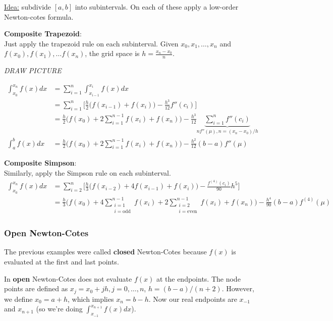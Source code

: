 \documentclass[12pt]{article}
\begin{document}
\underline{Idea:} subdivide $[a,b]$ into subintervals. On each of these apply a low-order Newton-cotes formula.

\textbf{Composite Trapezoid}:\\
Just apply the trapezoid rule on each subinterval. Given $x_0, x_1, \dots, x_n$ and $f(x_0), f(x_1), \dots f(x_n)$, the grid space is $h = \frac{x_n-x_0}{n}$.

\textit{DRAW PICTURE}

\begin{align}
\int_{x_0}^{x_n} f(x)dx &= \sum_{i=1}^n \int_{x_{i-1}}^{x_i} f(x)dx\\
&= \sum_{i=1}^n \bigl[ \frac{h}{2}\bigl(f(x_{i-1}) + f(x_i)\bigr) - \frac{h^3}{12}f''(c_i) \bigr] \\
&= \frac{h}{2}\bigl(f(x_0) + 2\sum_{i=1}^{n-1}f(x_i) + f(x_n)\bigr) - \frac{h^3}{12} \underbrace{\sum_{i=1}^n f''(c_i)}_{n f''(\mu), n = (x_n-x_0)/h}\\
%
\int_{a}^{b} f(x)dx &= \boxed{\frac{h}{2}\bigl(f(x_0) + 2\sum_{i=1}^{n-1}f(x_i) + f(x_n)\bigr) - \frac{h^2}{12}(b-a)f''(\mu) }
\end{align}
 
\textbf{Composite Simpson}:\\
Similarly, apply the Simpson rule on each subinterval. %
%
\begin{align}
\int_{x_0}^{x_n} f(x)dx &= \sum_{i=2}^n \bigl[ \frac{h}{3}\bigl(f(x_{i-2}) + 4f(x_{i-1}) + f(x_i)\bigr) - \frac{f^{(4)}(c_i)}{90}h^5 \bigr]\\
&= \frac{h}{3}\bigl(f(x_0) + 4\sum_{\substack{i=1\\i=\text{odd}}}^{n-1} f(x_i) + 2\sum_{\substack{i=2\\i=\text{even}}}^{n-1} f(x_i) + f(x_n)\bigr) - \frac{h^4}{90}(b-a)f^{(4)}(\mu)
\end{align}


\subsubsection{Open Newton-Cotes}
The previous examples were called \textbf{closed} Newton-Cotes because $f(x)$ is evaluated at the first and last points.

In \textbf{open} Newton-Cotes does not evaluate $f(x)$ at the endpoints. The node points are defined as $x_{j} = x_0 + jh, j = 0, \dots, n$, $h = (b-a)/(n+2)$. However, we define $x_{0} = a + h$, which implies $x_{n} = b - h$. Now our real endpoints are $x_{-1}$ and $x_{n+1}$ (so we're doing $\int_{x_{-1}}^{x_{n+1}} f(x)dx$).
\end{document}
